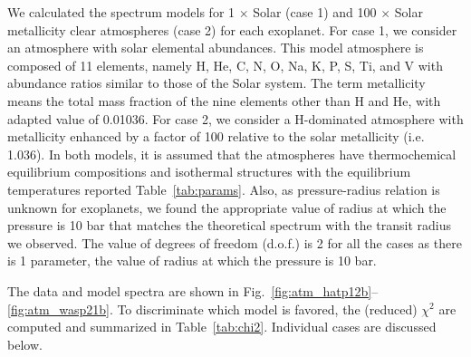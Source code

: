We calculated the spectrum models for 1 $\times$ Solar (case 1) and 100 $\times$ Solar metallicity clear atmospheres (case 2) for each exoplanet. For case 1, we consider an atmosphere with solar elemental abundances. This model atmosphere is composed of 11 elements, namely H, He, C, N, O, Na, K, P, S, Ti, and V with abundance ratios similar to those of the Solar system.%
The term metallicity means the total mass fraction of the nine elements other than H and He, with adapted value of 0.01036. For case 2, we consider a H-dominated atmosphere with metallicity enhanced by a factor of 100 relative to the solar metallicity (i.e. 1.036).
In both models, it is assumed that the atmospheres have thermochemical equilibrium compositions and isothermal structures with the equilibrium temperatures reported Table~\ref{tab:params}. %
Also, as pressure-radius relation is unknown for exoplanets, we found the appropriate value of radius at which the pressure is 10 bar that matches the theoretical spectrum with the transit radius we observed. The value of degrees of freedom (d.o.f.) is 2 for all the cases as there is 1 parameter, the value of radius at which the pressure is 10 bar. 

The data and model spectra are shown in Fig.~\ref{fig:atm_hatp12b}--\ref{fig:atm_wasp21b}. To discriminate which model is favored, the (reduced) $\chi^2$ %
are computed and summarized in Table~\ref{tab:chi2}. Individual cases are discussed below.

